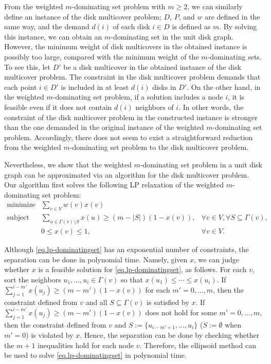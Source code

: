 \documentclass[11pt]{article}
\begin{document}
From the weighted $m$-dominating set problem with $m \geq 2$,
we can similarly define an instance of the disk multicover problem;
$D$, $P$, and $w$ are defined in the same way,
and the demand $d(i)$ of each disk $i \in D$ is defined as $m$.
By solving this instance, we can obtain
an $m$-dominating set in the unit disk graph.
However, the minimum weight of disk multicovers in the obtained instance
is possibly too large, compared with the minimum weight of the $m$-dominating sets.
To see this, let $D'$ be a disk multicover in the obtained instance of the
disk multicover problem.
The constraint in the disk multicover
problem demands that each point $i \in D'$ is included in at least
$d(i)$
disks in $D'$. On the other hand, in the weighted $m$-dominating set problem,
if a solution includes
a node $i$,
it is feasible even if
it does not contain $d(i)$ neighbors of $i$.
In other words, the constraint of the disk multicover problem
in the constructed instance is stronger than the one demanded in the original
instance of the weighted $m$-dominating set problem.
Accordingly, there does not seem to exist a straightforward reduction
from the weighted $m$-dominating set problem to the disk multicover problem.

Nevertheless, we show that
the weighted $m$-dominating set problem in a unit disk graph
can be approximated via an algorithm for 
the disk multicover problem.
Our algorithm first solves the following LP relaxation of the
weighted $m$-dominating set problem:
\begin{equation}
 \label{eq.lp-dominatingset}
 \begin{array}{lll}
  \text{minimize} & \sum_{v \in V} w(v) x(v)\\
  \text{subject to} & \sum_{u \in \Gamma(v)\setminus S} x(u) \geq (m-|S|)
   (1-x(v)), & \forall v \in V, \forall S \subseteq \Gamma(v),\\
  &  0 \leq x(v) \leq 1, & \forall v \in V.
 \end{array}
\end{equation}

Although \eqref{eq.lp-dominatingset}  has an exponential number
of constraints, the separation can be done in polynomial time.
Namely, given $x$, we can judge whether $x$ is a feasible solution for
\eqref{eq.lp-dominatingset}, as follows.
For each $v$, sort the neighbors $u_1,\ldots,u_i \in \Gamma(v)$ so that
$x(u_1) \leq \cdots \leq x(u_i)$.
If $\sum_{j=1}^{i-m'} x(u_{j}) \geq (m-m')(1-x(v))$  for each
$m'=0,\ldots,m$,
then the constraint defined from $v$ and all $S \subseteq \Gamma(v)$ is
satisfied by $x$.
If $\sum_{j=1}^{i-m'} x(u_{j}) \geq (m-m')(1-x(v))$ does not hold for some
$m'=0,\ldots,m$,
then the constraint defined from $v$ and
$S:=\{u_{i-m'+1},\ldots,u_{i}\}$
($S:= \emptyset$ when $m'=0$)
is
violated by $x$.
Hence, the separation can be done by checking whether the $m+1$
inequalities hold for each node $v$.
Therefore, the ellipsoid method can be used to solve \eqref{eq.lp-dominatingset} in polynomial time.
\end{document}
